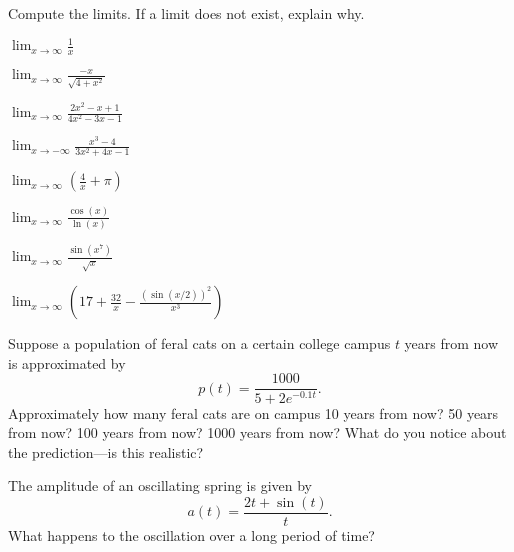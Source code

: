 \begin{exercises}

\noindent Compute the limits. If a limit does not exist, explain why.
\twocol
\begin{exercise}
$\lim_{x\to \infty} \frac{1}{x}$
\end{exercise}

\begin{exercise}
$\lim_{x\to \infty} \frac{-x}{\sqrt{4+x^2}}$
\end{exercise}

\begin{exercise}
$\lim_{x\to \infty} \frac{2x^2-x+1}{4x^2-3x-1}$
\end{exercise}

\begin{exercise}
$\lim_{x\to -\infty} \frac{x^3-4}{3x^2+4x-1}$
\end{exercise}


\begin{exercise}
$\lim_{x\to \infty} \left(\frac{4}{x}+\pi\right)$
\end{exercise}

\begin{exercise}
$\lim_{x\to \infty} \frac{\cos(x)}{\ln(x)}$
\end{exercise}

\begin{exercise}
$\lim_{x\to \infty} \frac{\sin\left(x^7\right)}{\sqrt{x}}$
\end{exercise}

\begin{exercise}
$\lim_{x\to \infty} \left(17 + \frac{32}{x} - \frac{\left(\sin(x/2)\right)^2}{x^3}\right)$
\end{exercise}

\endtwocol

\begin{exercise}
Suppose a population of feral cats on a certain college campus $t$
years from now is approximated by
\[
p(t) = \frac{1000}{5+ 2e^{-0.1 t}}.
\]
Approximately how many feral cats are on campus 10 years from now? 50
years from now? 100 years from now? 1000 years from now? What do you
notice about the prediction---is this realistic?
\end{exercise}

\begin{exercise}
The amplitude of an oscillating spring is given by
\[
a(t) = \frac{2t + \sin(t)}{t}.
\]
What happens to the oscillation over a long period of time?
\end{exercise}


\end{exercises}




